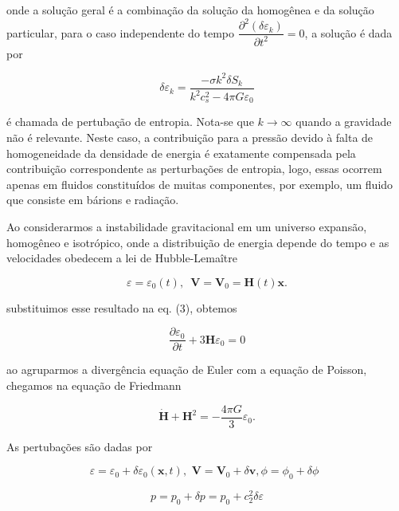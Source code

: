  onde a solução geral é a combinação da solução da homogênea e da solução particular, para o caso independente do tempo $  \dfrac{\partial^2 (\delta\varepsilon_k )}{\partial t^2}  = 0 $, a solução é dada por 
 
\begin{equation}\label{eq19}
	\delta\varepsilon_k  = \dfrac{ -\sigma k^2 \delta S_k}{k^2c^2_s - 4\pi G\varepsilon_0}
\end{equation}

é chamada de pertubação de entropia. Nota-se que $k \to \infty$ quando a gravidade não é relevante. Neste caso, a contribuição para a pressão devido à falta de homogeneidade da densidade de energia é exatamente compensada pela contribuição correspondente as perturbações de entropia, logo, essas ocorrem apenas em fluidos constituídos de muitas componentes, por exemplo, um fluido que consiste em bárions e radiação.

Ao considerarmos a instabilidade gravitacional em um universo expansão, homogêneo e isotrópico, onde a distribuição de energia depende do tempo e as velocidades obedecem a lei de Hubble-Lemaître

\begin{equation}\label{eq20}
	\varepsilon = \varepsilon_0 (t), \,\,\, \mathbf{V} = \mathbf{V}_0 = \mathbf{H} (t) \mathbf{x}.
\end{equation}
 
 substituimos esse resultado na eq. (3), obtemos
 
\begin{equation}\label{eq21}
	\dfrac{\partial \varepsilon_0}{\partial t}  + 3 \mathbf{H}\varepsilon_0 = 0 
\end{equation} 

ao agruparmos a divergência equação de Euler com a equação de Poisson, chegamos na equação de Friedmann

\begin{equation}\label{eq22}
	\dot{\mathbf{H}} + \mathbf{H}^2 = - \dfrac{4\pi G}{3}\varepsilon_0.
\end{equation}

As pertubações são dadas por

\begin{equation}\label{eq23}
	\varepsilon = \varepsilon_0 + \delta\varepsilon_0 (\mathbf{x},t),\,\, \mathbf{V} = \mathbf{V}_0 + \delta\mathbf{v} , \phi= \phi_0 + \delta\phi\,\,\, 
\end{equation}

$$p = p_0 + \delta p= p_0 + c_2^2\delta\varepsilon$$

